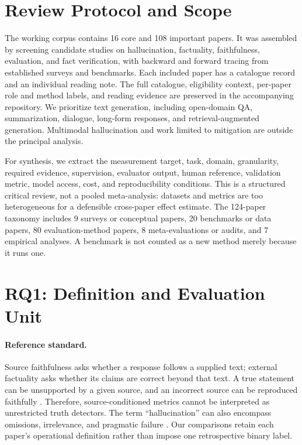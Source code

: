 \documentclass[11pt]{article}
\begin{document}
\section{Review Protocol and Scope}
The working corpus contains 16 core and 108 important papers. It was assembled by screening candidate studies on hallucination, factuality, faithfulness, evaluation, and fact verification, with backward and forward tracing from established surveys and benchmarks. Each included paper has a catalogue record and an individual reading note. The full catalogue, eligibility context, per-paper role and method labels, and reading evidence are preserved in the accompanying repository. We prioritize text generation, including open-domain QA, summarization, dialogue, long-form responses, and retrieval-augmented generation. Multimodal hallucination and work limited to mitigation are outside the principal analysis.

For synthesis, we extract the measurement target, task, domain, granularity, required evidence, supervision, evaluator output, human reference, validation metric, model access, cost, and reproducibility conditions. This is a structured critical review, not a pooled meta-analysis: datasets and metrics are too heterogeneous for a defensible cross-paper effect estimate. The 124-paper taxonomy includes 9 surveys or conceptual papers, 20 benchmarks or data papers, 80 evaluation-method papers, 8 meta-evaluations or audits, and 7 empirical analyses. A benchmark is not counted as a new method merely because it runs one.

\section{RQ1: Definition and Evaluation Unit}
\paragraph{Reference standard.} Source faithfulness asks whether a response follows a supplied text; external factuality asks whether its claims are correct beyond that text. A true statement can be unsupported by a given source, and an incorrect source can be reproduced faithfully \citep{I035,I041}. Therefore, source-conditioned metrics cannot be interpreted as unrestricted truth detectors. The term ``hallucination'' can also encompass omissions, irrelevance, and pragmatic failure \citep{C15,C16}. Our comparisons retain each paper's operational definition rather than impose one retrospective binary label.
\end{document}
